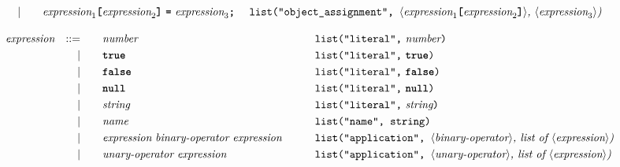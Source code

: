 \begin{alignat*}{9}
&&                       && |   &\quad && \textit{expression}_1 \textbf{\texttt{[}}
                                          \textit{expression}_2 \textbf{\texttt{]}} \ 
                                           \textbf{\texttt{=}}\  \textit{expression}_3  \textbf{\texttt{;}}\ 
                                                           && \texttt{list("object\_assignment", } \langle \textit{expression}_1 \textbf{\texttt{[}} \textit{expression}_2 \textbf{\texttt{]}}  \rangle \textit{,  } \langle \textit{expression}_3\rangle \textit{)} 
\end{alignat*}

\begin{alignat*}{9}
  && \textit{expression}
                         && ::= &\quad && \textit{number}  && \texttt{list("literal",}\ \textit{number}\texttt{)} \\
&&                       && |   &\quad && \textbf{\texttt{true}}
                                                           && \texttt{list("literal",}\ \textbf{\texttt{true}}\texttt{)} \\
&&                       && |   &\quad && \textbf{\texttt{false}}
                                                           && \texttt{list("literal",}\ \textbf{\texttt{false}}\texttt{)} \\
&&                       && |   &\quad && \textbf{\texttt{null}}
                                                           && \texttt{list("literal",}\ \textbf{\texttt{null}}\texttt{)} \\
&&                       && |   &\quad &&  \textit{string}
                                                           && \texttt{list("literal",}\ \textit{string}\texttt{)} \\
&&                       && |   &\quad &&  \textit{name}   && \texttt{list("name", string)}  \\
&&                       && |   &\quad &&  \textit{expression} \  \textit{binary-operator} \ 
                                            \textit{expression} \qquad
                                                           && \texttt{list("application",  } \langle \textit{binary-operator}\rangle \textit{, list of  } \langle \textit{expression}\rangle \textit{)} \\
&&                       && |   &\quad &&   \textit{unary-operator} \ 
                                            \textit{expression}
                                                           && \texttt{list("application",  } \langle \textit{unary-operator}\rangle \textit{, list of  } \langle \textit{expression}\rangle \textit{)} \\

\end{alignat*}
